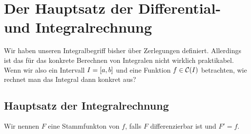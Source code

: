 \section{Der Hauptsatz der Differential- und Integralrechnung}
\thispagestyle{pagenumberonly}

Wir haben unseren Integralbegriff bisher über Zerlegungen definiert. Allerdings ist das für das konkrete Berechnen von Integralen nicht wirklich praktikabel. Wenn wir also ein Intervall $I=\left[a,b\right]$ und eine Funktion $f\in\mC\of{I}$ betrachten, wie rechnet man das Integral dann konkret aus?

\subsection{Hauptsatz der Integralrechnung}

\begin{definition}
    Wir nennen $F$ eine Stammfunkton von $f$, falls $F$ differenzierbar ist und $F'=f$.
\end{definition}

